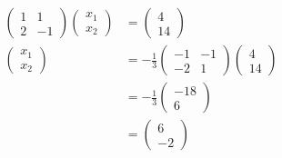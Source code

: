 \documentclass{article}
\begin{document}
\begin{align*}
  \begin{pmatrix}
    1 & 1  \\
    2 & -1
  \end{pmatrix} \begin{pmatrix}
                  x_1 \\
                  x_2
                \end{pmatrix} & = \begin{pmatrix}
                                    4 \\
                                    14
                                  \end{pmatrix}                            \\
  \begin{pmatrix}
    x_1 \\
    x_2
  \end{pmatrix}               & = -\frac{1}{3} \begin{pmatrix}
                                                 -1 & -1 \\
                                                 -2 & 1
                                               \end{pmatrix} \begin{pmatrix}
                                                               4 \\
                                                               14
                                                             \end{pmatrix} \\
                                & = -\frac{1}{3} \begin{pmatrix}
                                                   -18 \\
                                                   6
                                                 \end{pmatrix}             \\
                                & = \begin{pmatrix}
                                      6 \\
                                      -2
                                    \end{pmatrix}
\end{align*}

\setcounter{subsubsection}{48}
\subsubsection{}
\end{document}
